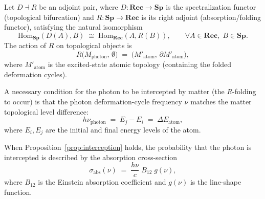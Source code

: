 
\begin{definition}\label{def:R-folding}
Let $D \dashv R$ be an adjoint pair, where
$D: \mathbf{Rec} \to \mathbf{Sp}$ is the spectralization functor (topological
bifurcation) and $R: \mathbf{Sp} \to \mathbf{Rec}$ is its right adjoint
(absorption/folding functor), satisfying the natural isomorphism
\[
\mathrm{Hom}_{\mathbf{Sp}}(D(A), B) \;\cong\; \mathrm{Hom}_{\mathbf{Rec}}(A, R(B)),
\qquad \forall A \in \mathbf{Rec},\; B \in \mathbf{Sp}.
\]
The action of $R$ on topological objects is
\[
R\bigl(M_{\mathrm{photon}},\, \emptyset\bigr) \;=\;
\bigl(M'_{\mathrm{atom}},\, \partial M'_{\mathrm{atom}}\bigr),
\]
where $M'_{\mathrm{atom}}$ is the excited-state atomic topology
(containing the folded deformation cycles).
\end{definition}

\begin{proposition}\label{prop:interception}
A necessary condition for the photon to be intercepted by matter
(the $R$-folding to occur) is that the photon deformation-cycle
frequency $\nu$ matches the matter topological level difference:
\[
h\nu_{\mathrm{photon}} \;=\; E_j - E_i \;=\; \Delta E_{\mathrm{atom}},
\]
where $E_i, E_j$ are the initial and final energy levels of the atom.
\end{proposition}

\begin{definition}\label{def:abs-cross-section}
When Proposition~\ref{prop:interception} holds, the probability that the photon is
intercepted is described by the absorption cross-section
\[
\sigma_{\mathrm{abs}}(\nu) \;=\; \frac{h\nu}{c}\; B_{12}\; g(\nu),
\]
where $B_{12}$ is the Einstein absorption coefficient and $g(\nu)$
is the line-shape function.
\end{definition}

